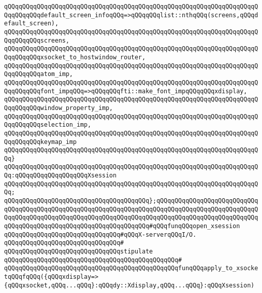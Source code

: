 \verb|qQQqqQQqqQQqqQQqqQQqqQQqqQQqqQQqqQQqqQQqqQQqqQQqqQQqqQQqqQQqqQQqqQQqqQQqqQQqqQQqdefault_screen_infoqQQq=>qQQqqQQqlist::nthqQQq(screens,qQQqdefault_screen),|\newline
\verb|qQQqqQQqqQQqqQQqqQQqqQQqqQQqqQQqqQQqqQQqqQQqqQQqqQQqqQQqqQQqqQQqqQQqqQQqqQQqqQQqscreens,|\newline
\verb|qQQqqQQqqQQqqQQqqQQqqQQqqQQqqQQqqQQqqQQqqQQqqQQqqQQqqQQqqQQqqQQqqQQqqQQqqQQqqQQqxsocket_to_hostwindow_router,|\newline
\verb|qQQqqQQqqQQqqQQqqQQqqQQqqQQqqQQqqQQqqQQqqQQqqQQqqQQqqQQqqQQqqQQqqQQqqQQqqQQqqQQqatom_imp,|\newline
\verb|qQQqqQQqqQQqqQQqqQQqqQQqqQQqqQQqqQQqqQQqqQQqqQQqqQQqqQQqqQQqqQQqqQQqqQQqqQQqqQQqfont_impqQQq=>qQQqqQQqfti::make_font_impqQQqqQQqxdisplay,|\newline
\verb|qQQqqQQqqQQqqQQqqQQqqQQqqQQqqQQqqQQqqQQqqQQqqQQqqQQqqQQqqQQqqQQqqQQqqQQqqQQqqQQqwindow_property_imp,|\newline
\verb|qQQqqQQqqQQqqQQqqQQqqQQqqQQqqQQqqQQqqQQqqQQqqQQqqQQqqQQqqQQqqQQqqQQqqQQqqQQqqQQqselection_imp,|\newline
\verb|qQQqqQQqqQQqqQQqqQQqqQQqqQQqqQQqqQQqqQQqqQQqqQQqqQQqqQQqqQQqqQQqqQQqqQQqqQQqqQQqkeymap_imp|\newline
\verb|qQQqqQQqqQQqqQQqqQQqqQQqqQQqqQQqqQQqqQQqqQQqqQQqqQQqqQQqqQQqqQQqqQQqqQQq}|\newline
\verb|qQQqqQQqqQQqqQQqqQQqqQQqqQQqqQQqqQQqqQQqqQQqqQQqqQQqqQQqqQQqqQQqqQQqqQQq:qQQqqQQqqQQqqQQqqQQqXsession|\newline
\verb|qQQqqQQqqQQqqQQqqQQqqQQqqQQqqQQqqQQqqQQqqQQqqQQqqQQqqQQqqQQqqQQqqQQqqQQq;|\newline
\verb|qQQqqQQqqQQqqQQqqQQqqQQqqQQqqQQqqQQqqQQq};qQQqqQQqqQQqqQQqqQQqqQQqqQQqqQQqqQQqqQQqqQQqqQQqqQQqqQQqqQQqqQQqqQQqqQQqqQQqqQQqqQQqqQQqqQQqqQQqqQQqqQQqqQQqqQQqqQQqqQQqqQQqqQQqqQQqqQQqqQQqqQQqqQQqqQQqqQQqqQQqqQQqqQQqqQQqqQQqqQQqqQQqqQQqqQQqqQQqqQQqqQQqqQQq#qQQqfunqQQqopen_xsession|\newline
\newline
\newline
\verb|qQQqqQQqqQQqqQQqqQQqqQQqqQQqqQQq#qQQqX-serverqQQqI/O.|\newline
\verb|qQQqqQQqqQQqqQQqqQQqqQQqqQQqqQQq#|\newline
\verb|qQQqqQQqqQQqqQQqqQQqqQQqqQQqqQQqstipulate|\newline
\verb|qQQqqQQqqQQqqQQqqQQqqQQqqQQqqQQqqQQqqQQqqQQqqQQq#|\newline
\verb|qQQqqQQqqQQqqQQqqQQqqQQqqQQqqQQqqQQqqQQqqQQqqQQqfunqQQqapply_to_xsocketqQQqfqQQq({qQQqxdisplay=>{qQQqxsocket,qQQq...qQQq}:qQQqdy::Xdisplay,qQQq...qQQq}:qQQqXsession)|\newline
